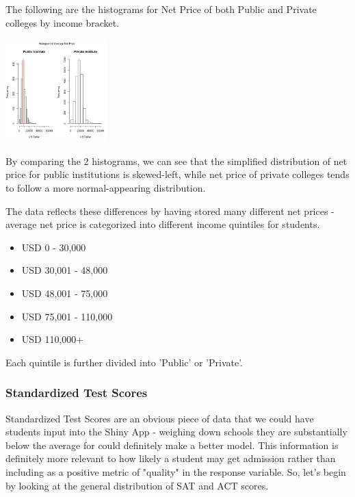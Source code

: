 \documentclass{article}\usepackage[]{graphicx}\usepackage[]{color}
\begin{document}
The following are the histograms for Net Price of both Public and Private colleges by income bracket.



{\centering \includegraphics[width=150px]{../images/histogram-meanNetPrice} 

}




By comparing the 2 histograms, we can see that the simplified distribution of net price for public institutions is skewed-left, while net price of private colleges tends to follow a more normal-appearing distribution. \newline

The data reflects these differences by having stored many different net prices - average net price is categorized into different income quintiles for students. 

\begin{itemize}
\item USD 0 - 30,000
\item USD 30,001 - 48,000
\item USD 48,001 - 75,000
\item USD 75,001 - 110,000
\item USD 110,000+
\end{itemize}

Each quintile is further divided into 'Public' or 'Private'. 

\subsubsection{Standardized Test Scores}

Standardized Test Scores are an obvious piece of data that we could have students input into the Shiny App - weighing down schools they are substantially below the average for could definitely make a better model. This information is definitely more relevant to how likely a student may get admission rather than including as a positive metric of "quality" in the response variable. So, let's begin by looking at the general distribution of SAT and ACT scores.
\end{document}
